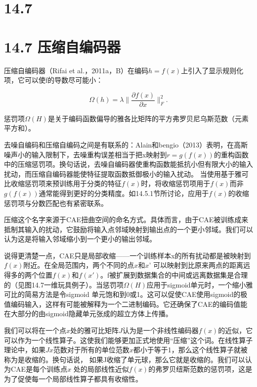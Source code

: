 ﻿%


\section{14.7}


\frontmatter
\section{14.7 压缩自编码器}
压缩自编码器（Rifai et al.，2011a，B）在编码$h=f(x)$上引入了显示规则化项，它可以使f的导数尽可能小：

\begin{equation}
 \Omega(h) = \lambda \Bigg\| \frac{\partial f(x)}{\partial x} \Bigg\|_F^2 .
\end{equation}

惩罚项$\Omega(H)$是关于编码函数偏导的雅各比矩阵的平方弗罗贝尼乌斯范数（元素平方和）。

去噪自编码和压缩自编码之间是有联系的：Alain和bengio（2013）表明，在高斯噪声小的输入限制下，去噪重构误差相当于把x映射到$r=g(f(x))$的重构函数中的压缩惩罚项。换句话说，去噪自编码器使重构函数能抵抗小但有限大小的输入扰动，而压缩自编码器能使特征提取函数抵御极小的输入扰动。 当使用基于雅可比收缩惩罚项来预训练用于分类的特征$f(x)$时，将收缩惩罚项用于$f(x)$而非$g(f(x))$通常能得到更好的分类精度。如14.5.1节所讨论，应用于$f(x)$的收缩惩罚项与分数匹配也有紧密联系。

压缩这个名字来源于CAE扭曲空间的命名方式。具体而言，由于CAE被训练成来抵制其输入的扰动，它鼓励将输入点邻域映射到输出点的一个更小邻域。我们可以认为这是将输入邻域缩小到一个更小的输出邻域。

说得更清楚一点，CAE只是局部收缩——一个训练样本x的所有扰动都是被映射到$f(x)$附近。在全局范围内，两个不同的点$x$和$x’$ 可以映射到比原来两点的距离远得多的两个位置$f(x)$和$f(x')$。f被扩展到数据集合的中间或远离数据集是合理的（见图14.7一维玩具例子）。当惩罚项$\Omega(H)$应用于sigmoid单元时，一个缩小雅可比的简易方法是令sigmoid 单元饱和到0或1。这可以促使CAE使用sigmoid的极值编码输入，这样有可能被解释为一个二进制编码。它还确保了CAE的编码值能在大部分的由sigmoid隐藏单元张成的超立方体上传播。

我们可以将在一个点$x$处的雅可比矩阵$J$认为是一个非线性编码器$f(x)$的近似，它可以作为一个线性算子。这使我们能够更加正式地使用“压缩”这个词。在线性算子理论中，如果$Jx$范数对于所有的单位范数$x$都小于等于1，那么这个线性算子就被称为是收缩的。换句话说， 如果J收缩了单元球，那么它就是收缩的。我们可以认为CAE是每个训练点$x$ 处的局部线性近似$f(x)$的弗罗贝纽斯范数的惩罚项，这是为了促使每一个局部线性算子都具有收缩性。

